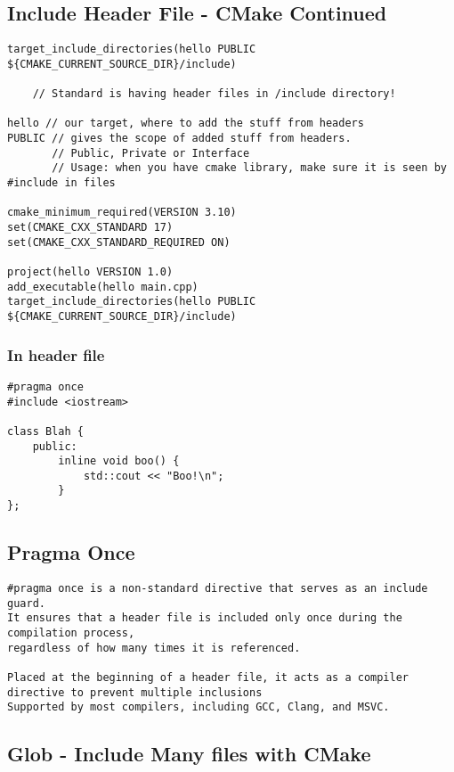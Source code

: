 \documentclass[openany]{report}
\begin{document}
\subsection{Include Header File - CMake Continued}

\begin{verbatim}
target_include_directories(hello PUBLIC ${CMAKE_CURRENT_SOURCE_DIR}/include)

    // Standard is having header files in /include directory!

hello // our target, where to add the stuff from headers
PUBLIC // gives the scope of added stuff from headers. 
       // Public, Private or Interface
       // Usage: when you have cmake library, make sure it is seen by #include in files

cmake_minimum_required(VERSION 3.10)
set(CMAKE_CXX_STANDARD 17)
set(CMAKE_CXX_STANDARD_REQUIRED ON)

project(hello VERSION 1.0)
add_executable(hello main.cpp)
target_include_directories(hello PUBLIC ${CMAKE_CURRENT_SOURCE_DIR}/include)
\end{verbatim}

\subsubsection{In header file}

\begin{verbatim}
#pragma once
#include <iostream>

class Blah {
    public:
        inline void boo() {
            std::cout << "Boo!\n";
        }
};
\end{verbatim}

\subsection{Pragma Once}

\begin{verbatim}
#pragma once is a non-standard directive that serves as an include guard. 
It ensures that a header file is included only once during the compilation process,
regardless of how many times it is referenced.

Placed at the beginning of a header file, it acts as a compiler directive to prevent multiple inclusions
Supported by most compilers, including GCC, Clang, and MSVC.
\end{verbatim}

\subsection{Glob - Include Many files with CMake}
 
\end{document}
